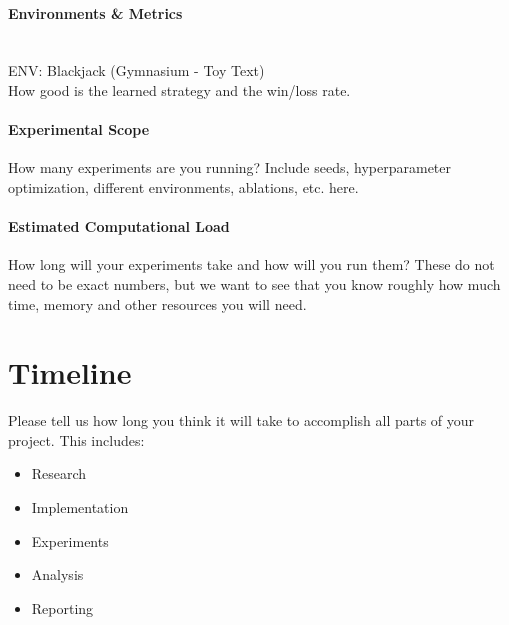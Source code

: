 \documentclass{article}
\begin{document}
\paragraph{Environments \& Metrics}
~\\
ENV: Blackjack (Gymnasium - Toy Text)\\
How good is the learned strategy and the win/loss rate.

\paragraph{Experimental Scope} How many experiments are you running? Include seeds, hyperparameter optimization, different environments, ablations, etc. here.

\paragraph{Estimated Computational Load} How long will your experiments take and how will you run them? These do not need to be exact numbers, but we want to see that you know roughly how much time, memory and other resources you will need.

\section{Timeline}
Please tell us how long you think it will take to accomplish all parts of your project. This includes:
\begin{itemize}
    \item Research
    \item Implementation
    \item Experiments
    \item Analysis
    \item Reporting
\end{itemize}
\end{document}
